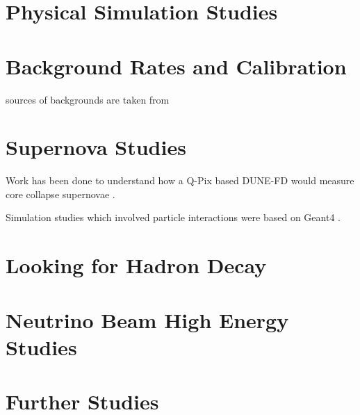 

\section{Physical Simulation Studies}

\section{Background Rates and Calibration}

sources of backgrounds are taken from \citep{DUNE-FD_TDRv4:Abi_2020}

\section{Supernova Studies}

Work has been done to understand how a Q-Pix based DUNE-FD would measure core collapse supernovae \citep{qpix:shion}.

Simulation studies which involved particle interactions were based on Geant4 \citep{geant4:AGOSTINELLI2003250}.


\section{Looking for Hadron Decay}

\section{Neutrino Beam High Energy Studies}

\section{Further Studies}
